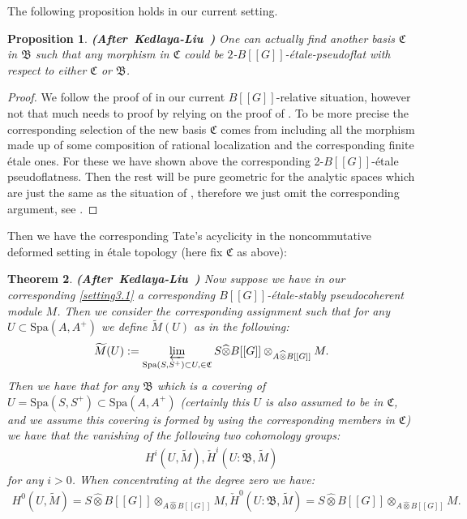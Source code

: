 \documentclass[12pt]{amsart}
\newtheorem{theorem}{Theorem}[section]
\newtheorem{proposition}[theorem]{Proposition}
\theoremstyle{definition}
\numberwithin{equation}{section}
\begin{document}
\indent The following proposition holds in our current setting. 


\begin{proposition} \mbox{\bf{(After Kedlaya-Liu \cite[Lemma 2.5.10]{KL2})}} \label{proposition3.19}
One can actually find another basis $\mathfrak{C}$ in $\mathfrak{B}$ such that any morphism in $\mathfrak{C}$ could be $2$-$B[[G]]$-\'etale-pseudoflat with respect to either $\mathfrak{C}$ or $\mathfrak{B}$.	
\end{proposition}



\begin{proof}
We follow the proof of \cite[Lemma 2.5.10]{KL2} in our current $B[[G]]$-relative situation, however not that much needs to proof by relying on the proof of \cite[Lemma 2.5.10]{KL2}. To be more precise the corresponding selection of the new basis $\mathfrak{C}$ comes from including all the morphism made up of some composition of rational localization and the corresponding finite \'etale ones. For these we have shown above the corresponding 2-$B[[G]]$-\'etale pseudoflatness. Then the rest will be pure geometric for the analytic spaces which are just the same as the situation of \cite[Lemma 2.5.10]{KL2}, therefore we just omit the corresponding argument, see \cite[Lemma 2.5.10]{KL2}.	
\end{proof}


\indent Then we have the corresponding Tate's acyclicity in the noncommutative deformed setting in \'etale topology (here fix $\mathfrak{C}$ as above):

\begin{theorem}\mbox{\bf{(After Kedlaya-Liu \cite[Theorem 2.5.11]{KL2})}} \label{theorem3.20} Now suppose we have in our corresponding \cref{setting3.1} a corresponding $B[[G]]$-\'etale-stably pseudocoherent module $M$. Then we consider the corresponding assignment such that for any $U\subset \mathrm{Spa}(A,A^+)$ we define $\widetilde{M}(U)$ as in the following:
\begin{align}
\widetilde{M}(U):=\varprojlim_{\mathrm{Spa}(S,S^+)\subset U,\in \mathfrak{C}} S\widehat{\otimes}B[[G]]\otimes_{A\widehat{\otimes}B[[G]]}M.	
\end{align}
Then we have that for any $\mathfrak{B}$ which is a covering of $U=\mathrm{Spa}(S,S^+)\subset \mathrm{Spa}(A,A^+)$ (certainly this $U$ is also assumed to be in $\mathfrak{C}$, and we assume this covering is formed by using the corresponding members in $\mathfrak{C}$) we have that the vanishing of the following two cohomology groups:
\begin{align}
H^i(U,\widetilde{M}), \check{H}^i(U:\mathfrak{B},\widetilde{M})
\end{align}
for any $i>0$. When concentrating at the degree zero we have:
\begin{align}
H^0(U,\widetilde{M})=S\widehat{\otimes}B[[G]]\otimes_{A\widehat{\otimes}B[[G]]}M, \check{H}^0(U:\mathfrak{B},\widetilde{M})=S\widehat{\otimes}B[[G]]\otimes_{A\widehat{\otimes}B[[G]]}M.
\end{align}
	
\end{theorem}
 	
\end{document}
